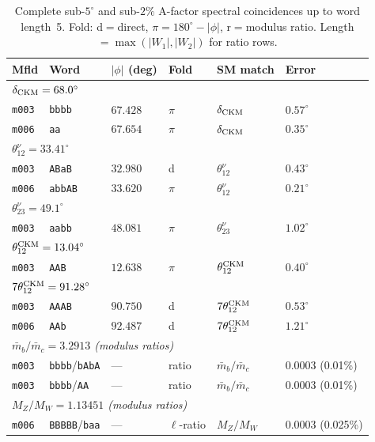 \documentclass[11pt,a4paper]{article}
\newcommand{\mfld}[1]{\texttt{#1}}
\newcommand{\word}[1]{\texttt{#1}}
\newcommand{\degr}{^{\circ}}
\begin{document}
\begin{table}[tp]
\centering
\caption{Complete sub-$5\degr$ and sub-$2\%$ A-factor spectral coincidences
  up to word length~5. Fold: d$=$direct, $\pi$$=180\degr-|\phi|$,
  r$=$modulus ratio. Length$=\max(|W_1|,|W_2|)$ for ratio rows.}
\label{tab:full}
\small
\begin{tabular}{llllll}
\toprule
Mfld & Word & $|\phi|$ (deg) & Fold & SM match & Error \\
\midrule
\multicolumn{6}{l}{\textit{$\delta_{\rm CKM}=68.0\degr$}}\\
\mfld{m003} & \word{bbbb} & $67.428$ & $\pi$ & $\delta_{\rm CKM}$ & $0.57\degr$ \\
\mfld{m006} & \word{aa} & $67.654$ & $\pi$ & $\delta_{\rm CKM}$ & $0.35\degr$ \\
\midrule
\multicolumn{6}{l}{\textit{$\theta_{12}^\nu=33.41\degr$}}\\
\mfld{m003} & \word{ABaB} & $32.980$ & d & $\theta_{12}^\nu$ & $0.43\degr$ \\
\mfld{m006} & \word{abbAB} & $33.620$ & $\pi$ & $\theta_{12}^\nu$ & $0.21\degr$ \\
\midrule
\multicolumn{6}{l}{\textit{$\theta_{23}^\nu=49.1\degr$}}\\
\mfld{m003} & \word{aabb} & $48.081$ & $\pi$ & $\theta_{23}^\nu$ & $1.02\degr$ \\
\midrule
\multicolumn{6}{l}{\textit{$\theta_{12}^{\rm CKM}=13.04\degr$}}\\
\mfld{m003} & \word{AAB} & $12.638$ & $\pi$ & $\theta_{12}^{\rm CKM}$ & $0.40\degr$ \\
\midrule
\multicolumn{6}{l}{\textit{$7\theta_{12}^{\rm CKM}=91.28\degr$}}\\
\mfld{m003} & \word{AAAB} & $90.750$ & d & $7\theta_{12}^{\rm CKM}$ & $0.53\degr$ \\
\mfld{m006} & \word{AAb} & $92.487$ & d & $7\theta_{12}^{\rm CKM}$ & $1.21\degr$ \\
\midrule
\multicolumn{6}{l}{\textit{$\bar{m}_b/\bar{m}_c=3.2913$ (modulus ratios)}}\\
\mfld{m003} & \word{bbbb}/\word{bAbA} & --- & ratio & $\bar{m}_b/\bar{m}_c$ & $0.0003$ (0.01\%) \\
\mfld{m003} & \word{bbbb}/\word{AA} & --- & ratio & $\bar{m}_b/\bar{m}_c$ & $0.0003$ (0.01\%) \\
\midrule
\multicolumn{6}{l}{\textit{$M_Z/M_W=1.13451$ (modulus ratios)}}\\
\mfld{m006} & \word{BBBBB}/\word{baa} & --- & $\ell$-ratio & $M_Z/M_W$ & $0.0003$ (0.025\%) \\
\bottomrule
\end{tabular}
\end{table}
\end{document}
